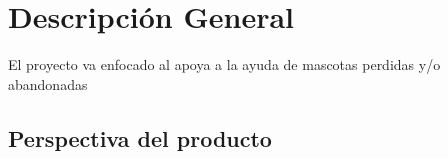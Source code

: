 \chapter{Descripción General}
El proyecto va enfocado al apoya a la ayuda de mascotas perdidas y/o abandonadas
\section{Perspectiva del producto}